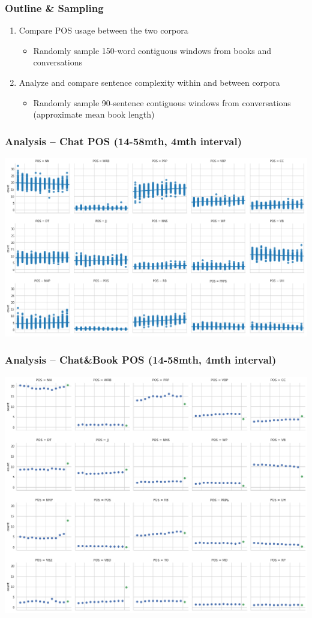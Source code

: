 \documentclass{beamer}
\begin{document}
\begin{frame}
	\frametitle{Outline \& Sampling}
	\begin{enumerate}
		\item Compare POS usage between the two corpora
		\begin{itemize}
			\item Randomly sample 150-word contiguous windows from books and conversations
		\end{itemize}
		\item Analyze and compare sentence complexity within and between corpora
		\begin{itemize}
			\item Randomly sample 90-sentence contiguous windows from conversations (approximate mean book length)
		\end{itemize}	
	\end{enumerate}	
\end{frame}
\begin{frame}
	\frametitle{Analysis --  Chat POS (14-58mth, 4mth interval)}
	\begin{center}
		\includegraphics[width=.9\linewidth]{../real_plots/pchatposdist.png}
	\end{center}

\end{frame}
\begin{frame}
	\frametitle{Analysis --  Chat\&Book POS (14-58mth, 4mth interval)}
	\begin{center}
		\includegraphics[width=.8\linewidth]{../real_plots/p&bavgpos.png}
	\end{center}
\end{frame}
\end{document}
